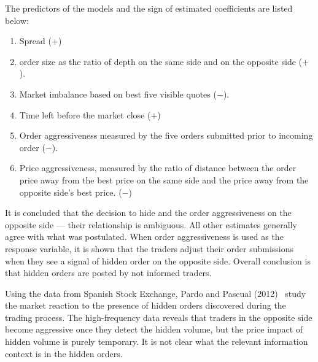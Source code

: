 The predictors of the models and the sign of estimated coefficients are listed below:
\begin{enumerate}[--]
\item Spread ($+$)
\item order size as the ratio of depth on the same side and on the opposite side ($+$).
\item Market imbalance based on best five visible quotes ($-$).
\item Time left before the market close ($+$)
\item Order aggressiveness measured by the five orders submitted prior to incoming order ($-$).
\item Price aggressiveness, measured by the ratio of distance between the order price away from the best price on the same side and the price away from the opposite side's best price. ($-$)
\end{enumerate}

It is concluded that the decision to hide and the order aggressiveness on the opposite side --- their relationship is ambiguous. All other estimates generally agree with what was postulated. When order aggressiveness is used as the response variable, it is shown that the traders adjust their order submissions when they see a signal of hidden order on the opposite side. Overall conclusion is that hidden orders are posted by not informed traders. 


Using the data from Spanish Stock Exchange, Pardo and Pascual (2012)~\cite{pardopas} study the market reaction to the presence of hidden orders discovered during the trading process. The high-frequency data reveals that traders in the opposite side become aggressive once they detect the hidden volume, but the price impact of hidden volume is purely temporary. It is not clear what the relevant information context is in the hidden orders.


